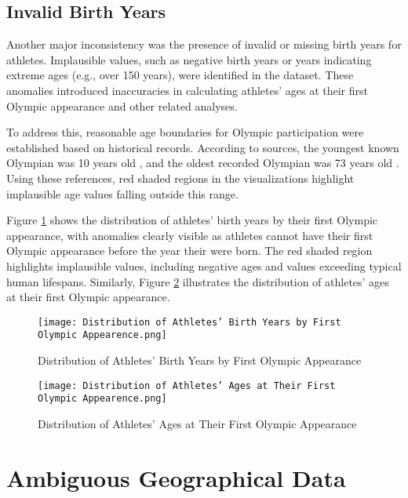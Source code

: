 \subsection{Invalid Birth Years}

Another major inconsistency was the presence of invalid or missing birth years for athletes. Implausible values, such as negative birth years or years indicating extreme ages (e.g., over 150 years), were identified in the dataset. These anomalies introduced inaccuracies in calculating athletes' ages at their first Olympic appearance and other related analyses.

To address this, reasonable age boundaries for Olympic participation were established based on historical records. According to sources, the youngest known Olympian was 10 years old \cite{youngest_olympian}, and the oldest recorded Olympian was 73 years old \cite{oldest_olympian}. Using these references, red shaded regions in the visualizations highlight implausible age values falling outside this range.

Figure \ref{fig:birth_years} shows the distribution of athletes' birth years by their first Olympic appearance, with anomalies clearly visible as athletes cannot have their first Olympic appearance before the year their were born. The red shaded region highlights implausible values, including negative ages and values exceeding typical human lifespans. Similarly, Figure \ref{fig:athlete_ages} illustrates the distribution of athletes' ages at their first Olympic appearance.

\begin{figure}[ht]
    \centering
    \texttt{[image: Distribution of Athletes' Birth Years by First Olympic Appearence.png]}
    \caption{Distribution of Athletes' Birth Years by First Olympic Appearance}
    \label{fig:birth_years}
\end{figure}

\begin{figure}[ht]
    \centering
    \texttt{[image: Distribution of Athletes' Ages at Their First Olympic Appearence.png]}
    \caption{Distribution of Athletes' Ages at Their First Olympic Appearance}
    \label{fig:athlete_ages}
\end{figure}

\section{Ambiguous Geographical Data}

